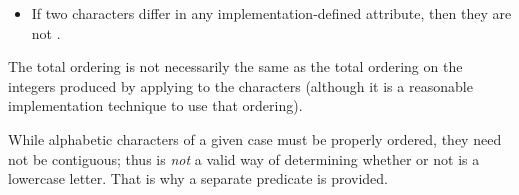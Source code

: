 \begin{defun}[Function]
\begin{newer}
\begin{itemize}
\item
If two characters differ in any implementation-defined
attribute, then they are not .
\end{itemize}
\end{newer}

The total ordering is not necessarily the same as the total
ordering on the integers produced by applying  to the
characters (although it is a reasonable implementation technique to
use that ordering).

While alphabetic characters of a given case must be
properly ordered, they need not be contiguous; thus  is \emph{not} a valid way of determining whether or not  is a
lowercase letter.  That is why a separate
 predicate is provided.


\end{defun}

